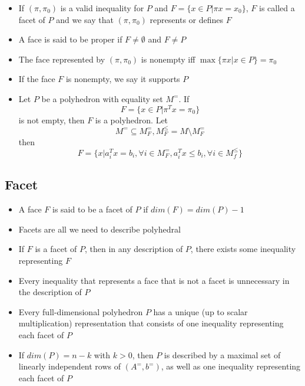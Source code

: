                 \begin{itemize}
                    \item If $(\pi, \pi_0)$ is a valid inequality for $P$ and $F=\{x\in P|\pi x=x_0\}$, $F$ is called a facet of $P$ and we say that $(\pi, \pi_0)$ represents or defines $F$
                    \item A face is said to be proper if $F\ne \emptyset$ and $F\ne P$
                    \item The face represented by $(\pi, \pi_0)$ is nonempty iff $\max \{\pi x |x\in P\}=\pi_0$
                    \item If the face $F$ is nonempty, we say it supports $P$
                    \item Let $P$ be a polyhedron with equality set $M^=$. If
                        \begin{equation*}
                            F=\{x\in P | \pi^T x = \pi_0\}
                        \end{equation*}
                        is not empty, then $F$ is a polyhedron. Let 
                        \begin{equation*}
                            M^= \subseteq M_F^=, M_F^{\le}=M \setminus M_F^= 
                        \end{equation*}
                        then 
                        \begin{equation*}
                            F=\{x | a_i^T x=b_i, \forall i \in M_F^=, a_i^T x \le b_i, \forall i \in M_f^{\le}\}
                        \end{equation*}
                \end{itemize}

            \subsection{Facet}
                \begin{itemize}
                    \item A face $F$ is said to be a facet of $P$ if $dim(F) = dim(P)-1$
                    \item Facets are all we need to describe polyhedral
                    \item If $F$ is a facet of $P$, then in any description of $P$, there exists some inequality representing $F$
                    \item Every inequality that represents a face that is not a facet is unnecessary in the description of $P$
                    \item Every full-dimensional polyhedron $P$ has a unique (up to scalar multiplication) representation that consists of one inequality representing each facet of $P$
                    \item If $dim(P) = n-k$ with $k>0$, then $P$ is described by a maximal set of linearly independent rows of $(A^=, b^=)$, as well as one inequality representing each facet of $P$
                \end{itemize}
                
